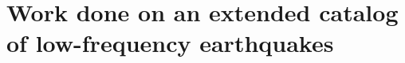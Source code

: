 \documentclass[workdone.tex]{subfiles}
\begin{document}
\chapter{Work done on an extended catalog of low-frequency earthquakes}
\end{document}
